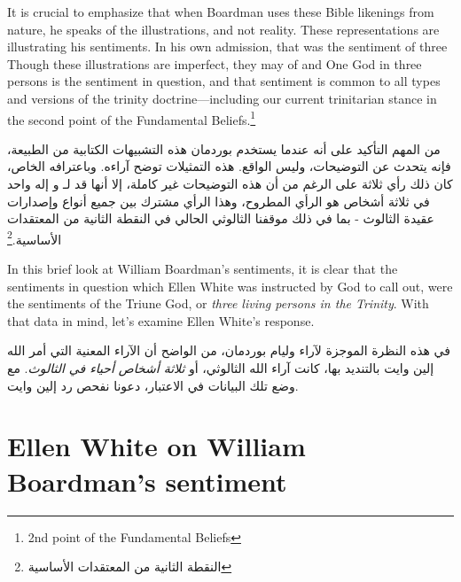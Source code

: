 It is crucial to emphasize that when Boardman uses these Bible likenings from nature, he speaks of the illustrations, and not reality. These representations are illustrating his sentiments. In his own admission, that was the sentiment of three  Though these illustrations are imperfect, they may  of  and  One God in three persons is the sentiment in question, and that sentiment is common to all types and versions of the trinity doctrine—including our current trinitarian stance in the second point of the Fundamental Beliefs.\footnote{ 2nd point of the Fundamental Beliefs}


من المهم التأكيد على أنه عندما يستخدم بوردمان هذه التشبيهات الكتابية من الطبيعة، فإنه يتحدث عن التوضيحات، وليس الواقع. هذه التمثيلات توضح آراءه. وباعترافه الخاص، كان ذلك رأي ثلاثة  على الرغم من أن هذه التوضيحات غير كاملة، إلا أنها قد  لـ  و  إله واحد في ثلاثة أشخاص هو الرأي المطروح، وهذا الرأي مشترك بين جميع أنواع وإصدارات عقيدة الثالوث - بما في ذلك موقفنا الثالوثي الحالي في النقطة الثانية من المعتقدات الأساسية.\footnote{ النقطة الثانية من المعتقدات الأساسية}


In this brief look at William Boardman's sentiments, it is clear that the sentiments in question which Ellen White was instructed by God to call out, were the sentiments of the Triune God, or \textit{three living persons in the Trinity}. With that data in mind, let's examine Ellen White's response.


في هذه النظرة الموجزة لآراء وليام بوردمان، من الواضح أن الآراء المعنية التي أمر الله إلين وايت بالتنديد بها، كانت آراء الله الثالوثي، أو \textit{ثلاثة أشخاص أحياء في الثالوث}. مع وضع تلك البيانات في الاعتبار، دعونا نفحص رد إلين وايت.


\section*{Ellen White on William Boardman’s sentiment}


